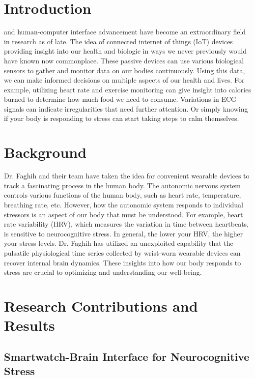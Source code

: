 \documentclass[journal,onecolumn]{IEEEtran}
\begin{document}
\IEEEpeerreviewmaketitle

\section{Introduction}

 and human-computer interface advancement have become an extraordinary field in research as of late. The idea of connected internet of things (IoT) devices providing insight into our health and biologic in ways we never previously would have known now commonplace. These passive devices can use various biological sensors to gather and monitor data on our bodies continuously. Using this data, we can make informed decisions on multiple aspects of our health and lives. For example, utilizing heart rate and exercise monitoring can give insight into calories burned to determine how much food we need to consume. Variations in ECG signals can indicate irregularities that need further attention. Or simply knowing if your body is responding to stress can start taking steps to calm themselves. 

\section{Background}

Dr. Faghih and their team have taken the idea for convenient wearable devices to track a fascinating process in the human body. The autonomic nervous system controls various functions of the human body, such as heart rate, temperature, breathing rate, etc. However, how the autonomic system responds to individual stressors is an aspect of our body that must be understood. For example, heart rate variability (HRV), which measures the variation in time between heartbeats, is sensitive to neurocognitive stress. In general, the lower your HRV, the higher your stress levels. Dr. Faghih has utilized an unexploited capability that the pulsatile physiological time series collected by wrist-worn wearable devices can recover internal brain dynamics. These insights into how our body responds to stress are crucial to optimizing and understanding our well-being. 

\section{Research Contributions and Results}

\subsection{Smartwatch-Brain Interface for Neurocognitive Stress}
\end{document}
